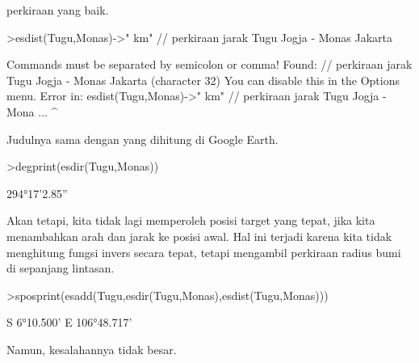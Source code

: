 \documentclass[a4paper,10pt]{article}
\begin{document}
\begin{eulernotebook}
\begin{eulercomment}
\begin{eulercomment}
\begin{eulercomment}
\begin{eulercomment}
\begin{eulercomment}
\begin{eulercomment}
\begin{eulercomment}
\begin{eulercomment}
\begin{eulercomment}
\begin{eulercomment}
\begin{eulercomment}
\begin{eulercomment}
\begin{eulercomment}
\begin{eulercomment}
\begin{eulercomment}
\begin{eulercomment}
\begin{eulercomment}
\begin{eulercomment}
\begin{eulercomment}
\begin{eulercomment}
\begin{eulercomment}
\begin{eulercomment}
\begin{eulercomment}
\begin{eulercomment}
\begin{eulercomment}
\begin{eulercomment}
\begin{eulercomment}
\begin{eulercomment}
\begin{eulercomment}
\begin{eulercomment}
\begin{eulercomment}
\begin{eulercomment}
\begin{eulercomment}
\begin{eulercomment}
\begin{eulercomment}
perkiraan yang baik.
\end{eulercomment}
\begin{eulerprompt}
>esdist(Tugu,Monas)->" km" // perkiraan jarak Tugu Jogja - Monas Jakarta
\end{eulerprompt}
\begin{euleroutput}
  Commands must be separated by semicolon or comma!
  Found:  // perkiraan jarak Tugu Jogja - Monas Jakarta (character 32)
  You can disable this in the Options menu.
  Error in:
  esdist(Tugu,Monas)->" km" // perkiraan jarak Tugu Jogja - Mona ...
                           ^
\end{euleroutput}
\begin{eulercomment}
Judulnya sama dengan yang dihitung di Google Earth.
\end{eulercomment}
\begin{eulerprompt}
>degprint(esdir(Tugu,Monas))
\end{eulerprompt}
\begin{euleroutput}
  294°17'2.85''
\end{euleroutput}
\begin{eulercomment}
Akan tetapi, kita tidak lagi memperoleh posisi target yang tepat, jika
kita menambahkan arah dan jarak ke posisi awal. Hal ini terjadi karena
kita tidak menghitung fungsi invers secara tepat, tetapi mengambil
perkiraan radius bumi di sepanjang lintasan.
\end{eulercomment}
\begin{eulerprompt}
>sposprint(esadd(Tugu,esdir(Tugu,Monas),esdist(Tugu,Monas)))
\end{eulerprompt}
\begin{euleroutput}
  S 6°10.500' E 106°48.717'
\end{euleroutput}
\begin{eulercomment}
Namun, kesalahannya tidak besar.
\end{eulercomment}

\end{eulercomment}
\end{eulercomment}
\end{eulercomment}
\end{eulercomment}
\end{eulercomment}
\end{eulercomment}
\end{eulercomment}
\end{eulercomment}
\end{eulercomment}
\end{eulercomment}
\end{eulercomment}
\end{eulercomment}
\end{eulercomment}
\end{eulercomment}
\end{eulercomment}
\end{eulercomment}
\end{eulercomment}
\end{eulercomment}
\end{eulercomment}
\end{eulercomment}
\end{eulercomment}
\end{eulercomment}
\end{eulercomment}
\end{eulercomment}
\end{eulercomment}
\end{eulercomment}
\end{eulercomment}
\end{eulercomment}
\end{eulercomment}
\end{eulercomment}
\end{eulercomment}
\end{eulercomment}
\end{eulercomment}
\end{eulercomment}
\end{eulernotebook}
\end{document}
